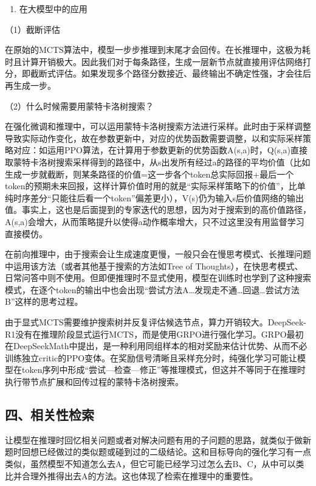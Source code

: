 \begin{enumerate}
\def\labelenumi{\arabic{enumi}.}
\setcounter{enumi}{2}
\tightlist
\item
  在大模型中的应用
\end{enumerate}

（1）截断评估

在原始的MCTS算法中，模型一步步推理到末尾才会回传。在长推理中，这极为耗时且计算开销极大。因此我们对于每条路径，生成一层新节点就直接用评估网络打分，即截断式评估。如果发现多个路径分数接近、最终输出不确定性强，才会往后再生成一步。

（2）什么时候需要用蒙特卡洛树搜索？

在强化微调和推理中，可以运用蒙特卡洛树搜索方法进行采样。此时由于采样调整导致实际动作变化，故在参数更新中，对应的优势函数需要调整，以和实际采样策略对应：如运用PPO算法，在计算用于参数更新的优势函数A(s,a)时，Q(s,a)直接取蒙特卡洛树搜索采样得到的路径中，从s出发所有经过a的路径的平均价值（比如生成一步就截断，则某条路径的价值=这一步各个token总实际回报+最后一个token的预期未来回报，这样计算价值时用的就是``实际采样策略下的价值''，比单纯时序差分``只能往后看一个token''偏差更小），V(s)仍为输入s后价值网络的输出值。事实上，这也是后面提到的专家迭代的思想，因为对于搜索到的高价值路径，A(s,a)会增大，从而策略提升以使得a动作概率增大，只不过这里没有用监督学习直接模仿。

在前向推理中，由于搜索会让生成速度更慢，一般只会在慢思考模式、长推理问题中运用该方法（或者其他基于搜索的方法如Tree of Thoughts），在快思考模式、日常问答中则不使用。但即便推理时不显式使用，模型在训练时也学到了这种搜索模式，在逐个token的输出中也会出现``尝试方法A\ldots 发现走不通\ldots 回退\ldots 尝试方法B''这样的思考过程。

由于显式MCTS需要维护搜索树并反复评估候选节点，算力开销较大。DeepSeek-R1没有在推理阶段显式运行MCTS，而是使用GRPO进行强化学习。GRPO最初在DeepSeekMath中提出，是一种利用同组样本的相对奖励来估计优势、从而不必训练独立critic的PPO变体。在奖励信号清晰且采样充分时，纯强化学习可能让模型在token序列中形成``尝试---检查---修正''等推理模式，但这并不等同于在推理时执行带节点扩展和回传过程的蒙特卡洛树搜索。

\hypertarget{ux56dbux76f8ux5173ux6027ux68c0ux7d22}{%
\subsection{四、相关性检索}\label{ux56dbux76f8ux5173ux6027ux68c0ux7d22}}

让模型在推理时回忆相关问题或者对解决问题有用的子问题的思路，就类似于做新题时回想已经做过的类似题或碰到过的二级结论。这和目标导向的强化学习有一点类似，虽然模型不知道怎么去A，但它可能已经学习过怎么去B、C，从中可以类比并合理外推得出去A的方法。这也体现了检索在推理中的重要性。

